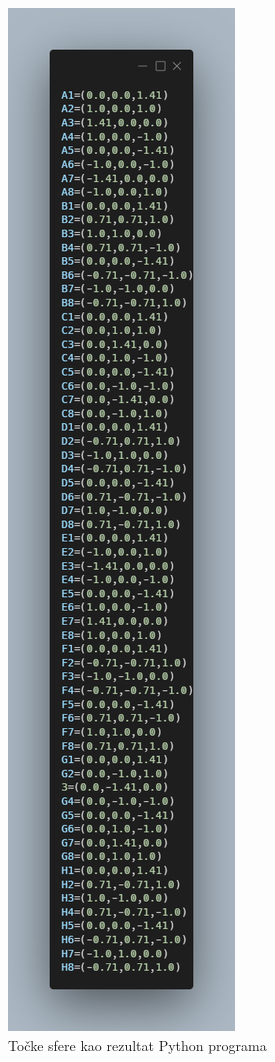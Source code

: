 \documentclass[a4paper,12pt]{article}
\begin{document}
\begin{figure}[ht]
    \centering
    \includegraphics[scale=0.5]{image/točke.png}
    \caption{Točke sfere kao rezultat Python programa}
    
\end{figure}
\clearpage
\end{document}

